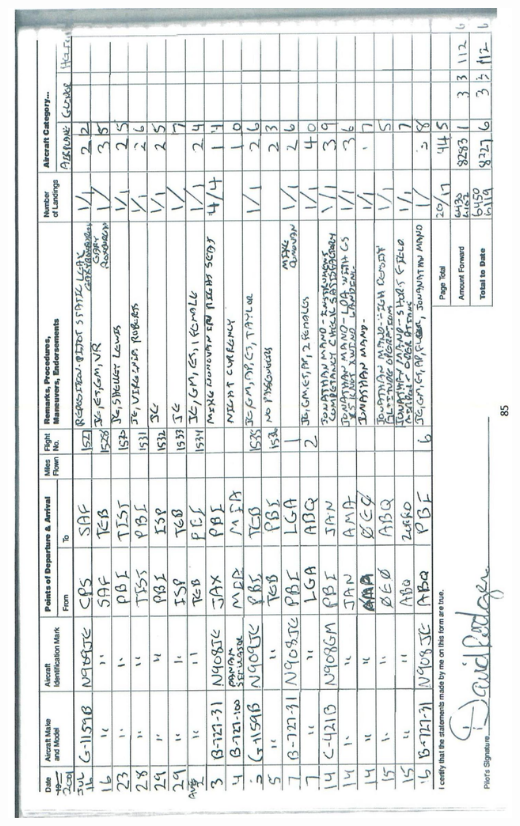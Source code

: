 \documentclass[10pt]{article}
\begin{document}
\includegraphics[max width=\textwidth, center]{2025_02_27_dd68c3d38de88f0516d9g-089}\\
\end{document}
